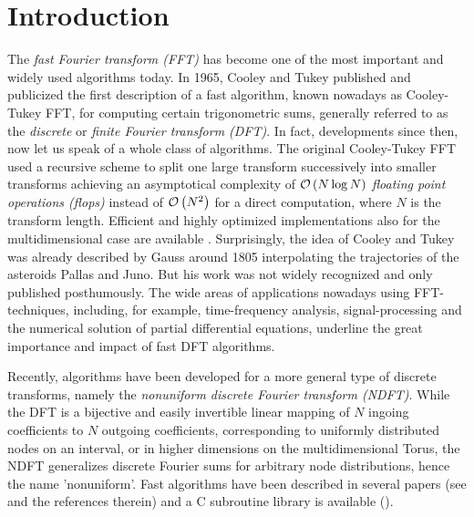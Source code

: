 
\chapter{Introduction}
\label{Introduction}

The \emph{fast Fourier transform (FFT)} has become one of the most important 
and widely used algorithms today. In 1965, Cooley and Tukey \cite{cotu} published
and publicized the first description of a fast algorithm, known nowadays as Cooley-Tukey 
FFT, for computing certain trigonometric sums, generally referred to as the 
\emph{discrete} or \emph{finite Fourier transform (DFT)}. In fact, developments since then, now
let us speak of a whole class of algorithms. The original Cooley-Tukey FFT
used a recursive scheme to split one large transform successively into
smaller transforms achieving an asymptotical complexity of 
$\mathcal{O}\left(N \log N\right)$ \emph{floating point operations (flops)} instead of
$\mathcal{O}\left(N^2\right)$ for a direct computation, where $N$ is the transform length. 
Efficient and highly optimized implementations also for the
multidimensional case are available \cite{fftw}.
Surprisingly, the idea of Cooley and Tukey was already described by Gauss around
1805 \cite{hejobu} interpolating the trajectories of the asteroids Pallas 
and Juno. But his work was not widely recognized and only published posthumously.
The wide areas of applications nowadays using FFT-techniques, including, for example, 
time-frequency analysis, signal-processing and the numerical solution of 
partial differential equations, underline the great importance and impact of fast
DFT algorithms.

Recently, algorithms have been developed for a more general type of discrete 
transforms, namely the \emph{nonuniform discrete Fourier transform (NDFT)}. 
While the DFT is a bijective and easily invertible linear mapping of $N$ 
ingoing coefficients to $N$ outgoing coefficients, corresponding to
uniformly distributed nodes on an interval, or in higher dimensions on 
the multidimensional Torus, the NDFT generalizes
discrete Fourier sums for arbitrary node distributions, hence the name
'nonuniform'. Fast algorithms have been described in several papers 
(see \cite{postta01} and the references therein) and a C subroutine library is available 
(\cite{kupo02C}).

